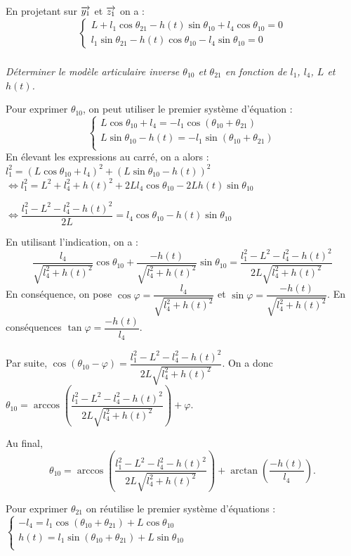 \documentclass[10pt,fleqn]{article} %
\begin{document}
\begin{multicols}{2}
\begin{corrige}
En projetant sur $\overrightarrow{y_1}$ et $\overrightarrow{z_1}$ on a :
$$
\left\{
\begin{array}{l}
L+l_1\cos\theta_{21}-h(t)\sin\theta_{10}+l_4\cos\theta_{10}={0} \\
l_1\sin\theta_{21}-h(t)\cos\theta_{10}-l_4\sin\theta_{10}={0}
\end{array}
\right.
$$


\end{corrige}
\else
\fi


\subparagraph{}\textit{Déterminer le modèle articulaire inverse $\theta_{10}$ et $\theta_{21}$ en fonction de $l_1$, $l_4$, $L$ et $h(t)$.}
\ifprof
\begin{corrige}
Pour exprimer $\theta_{10}$, on peut utiliser le premier système d'équation : 
$$
\left\{
\begin{array}{l}
L\cos\theta_{10}+l_4 =-l_1\cos\left(\theta_{10}+\theta_{21}\right) \\
L\sin\theta_{10}-h(t)  =-l_1\sin\left(\theta_{10}+\theta_{21}\right) \\
\end{array}
\right.
$$
En élevant les expressions au carré, on a alors : 
$
l_1^2 = \left(L\cos\theta_{10}+l_4 \right)^2+ \left(L\sin\theta_{10}-h(t)\right)^2
$
$
\Leftrightarrow 
l_1^2 = L^2+l_4^2 +h(t)^2+2Ll_4\cos\theta_{10} -2Lh(t)\sin\theta_{10}
$

$
\Leftrightarrow 
\dfrac{l_1^2 - L^2-l_4^2 -h(t)^2}{2L}=l_4\cos\theta_{10} -h(t)\sin\theta_{10}
$

En utilisant l'indication, on a : 
$$
\dfrac{l_4}{\sqrt{l_4^2 + h(t)^2}}\cos\theta_{10} +\dfrac{-h(t)}{\sqrt{l_4^2 + h(t)^2}}\sin\theta_{10}=\dfrac{l_1^2 - L^2-l_4^2 -h(t)^2}{2L{\sqrt{l_4^2 + h(t)^2}}}
$$
En conséquence, on pose $\cos\varphi=\dfrac{l_4}{\sqrt{l_4^2 + h(t)^2}}$ et 
$\sin\varphi = \dfrac{-h(t)}{\sqrt{l_4^2 + h(t)^2}}$. 
En conséquences %
$\tan\varphi =\dfrac{-h(t)}{l_4}$.


Par suite, $\cos\left( \theta_{10} - \varphi \right) =\dfrac{l_1^2 - L^2-l_4^2 -h(t)^2}{2L{\sqrt{l_4^2 + h(t)^2}}}$. On a donc 
$\theta_{10} =\arccos \left( \dfrac{l_1^2 - L^2-l_4^2 -h(t)^2}{2L{\sqrt{l_4^2 + h(t)^2}}}\right) + \varphi$.


Au final, 
$$\theta_{10} =\arccos \left( \dfrac{l_1^2 - L^2-l_4^2 -h(t)^2}{2L{\sqrt{l_4^2 + h(t)^2}}}\right) + \arctan\left(\dfrac{-h(t)}{l_4} \right).$$

Pour exprimer  $\theta_{21}$ on réutilise le premier système d'équations :
$
\left\{
\begin{array}{l}
-l_4 =l_1\cos\left(\theta_{10}+\theta_{21}\right) + L\cos\theta_{10} \\
h(t)  =l_1\sin\left(\theta_{10}+\theta_{21}\right) + L\sin\theta_{10}\\
\end{array}
\right.
$


\end{corrige}
\end{multicols}
\end{document}
